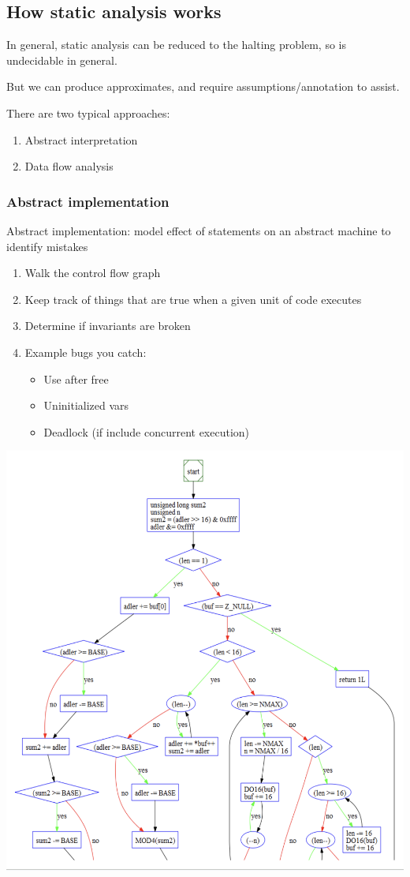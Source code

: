 \documentclass{article}
\begin{document}
\subsection{How static analysis works}

In general, static analysis can be reduced to the halting problem, so is undecidable in general. 

\vspace*{1em}

But we can produce approximates, and require assumptions/annotation to assist.

\vspace*{1em}

There are two typical approaches:
\begin{enumerate}
    \item Abstract interpretation
    \item Data flow analysis
\end{enumerate}

\subsubsection{Abstract implementation}
Abstract implementation: model effect of statements on an abstract machine to identify mistakes

\begin{enumerate}
    \item Walk the control flow graph 
    \item Keep track of things that are true when a given unit of code executes 
    \item Determine if invariants are broken 
    \item Example bugs you catch:
    \begin{itemize}
        \item Use after free 
        \item Uninitialized vars 
        \item Deadlock (if include concurrent execution)
    \end{itemize}
\end{enumerate}

\includegraphics*[width=0.8\linewidth]{abstractInterpretation.png}
\end{document}
